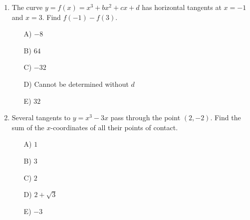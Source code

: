 \documentclass[11pt,a4paper]{article}
\newlength{\ipadheight}
\renewcommand{\ans}[1]{%
  \par\noindent
  \begin{minipage}[t][\ipadheight][t]{\linewidth}%
    \raggedleft\vspace*{\fill}%
    {\fontsize{4}{5}\selectfont\color{black!22}\rotatebox{180}{Ans:~#1}}%
  \end{minipage}%
  \par\vspace{4pt}}
\renewcommand{\method}[1]{}
\renewcommand{\inv}[1]{}
\begin{document}
\begin{enumerate}
\ans{A) $y=4x-4$ only}
\method{The tangent to $y=x^2$ at $x=a$ is $y=2ax-a^2$. The tangent to $y=-(x-2)^2$ at $x=b$ is $y=-2(b-2)x+b^2-4$. Matching gradients and intercepts gives $a=2-b$ and $-(2-b)^2=b^2-4$, so $2b^2-4b=0$ and $b=0$ or $2$. The root $b=2$ gives $a=0$ and the common tangent $y=0$; the other root $b=0$ gives $a=2$ and $y=4x-4$. Decoys: B takes the second gradient as $+2(b-2)$, giving $y=-4x-4$; C assumes mirror symmetry and keeps both; D forces both points of contact to have the same $x$-coordinate, $2a=-2(a-2)$, giving $a=1$ and $y=2x-1$; E writes the first tangent as $y=2ax+a^2$, which leaves only $y=0$.}
\inv{For $y=x^2$ and $y=-(x-k)^2$, show the common tangents are $y=0$ and $y=2kx-k^2$, touching at $x=k$ and $x=0$ respectively. What happens as $k\to0$? What if the second curve is shifted to $y=-(x-k)^2+m$?}

\needspace{12cm}
\item The curve $y=f(x)=x^3+bx^2+cx+d$ has horizontal tangents at $x=-1$ and $x=3$. Find $f(-1)-f(3)$.
\begin{itemize}
\item[A)] $-8$
\item[B)] $64$
\item[C)] $-32$
\item[D)] Cannot be determined without $d$
\item[E)] $32$
\end{itemize}

\ans{E) $32$}
\method{Write $f'=3x^2+2bx+c$. Horizontal tangents at $x=-1$ and $x=3$ give $f'=3(x+1)(x-3)=3x^2-6x-9$, so $b=-3$, $c=-9$. Then $f(-1)=5+d$ and $f(3)=-27+d$, so $f(-1)-f(3)=32$ for every $d$. Decoys: A forgets the factor $3$, using $f'=(x+1)(x-3)$, so $b=-1$, $c=-3$; with the cubic still monic this gives $f(-1)-f(3)=-8$; B assumes the gap is $(3-(-1))^3=64$; C computes $f(3)-f(-1)=-32$; D does not notice that $d$ cancels.}
\inv{Show that for $y=x^3+bx^2+cx+d$ with horizontal tangents a distance $D$ apart, the vertical gap is always $\dfrac{D^3}{2}$. Do NOT use integration (that is Day 4): translate so the horizontal tangents are at $x=\pm h$, giving $y=x^3-3h^2x+\text{const}$. What changes if the leading coefficient is $k$?}

\needspace{12cm}
\item Several tangents to $y=x^3-3x$ pass through the point $(2,-2)$. Find the sum of the $x$-coordinates of all their points of contact.
\begin{itemize}
\item[A)] $1$
\item[B)] $3$
\item[C)] $2$
\item[D)] $2+\sqrt3$
\item[E)] $-3$
\end{itemize}


\end{enumerate}
\end{document}
